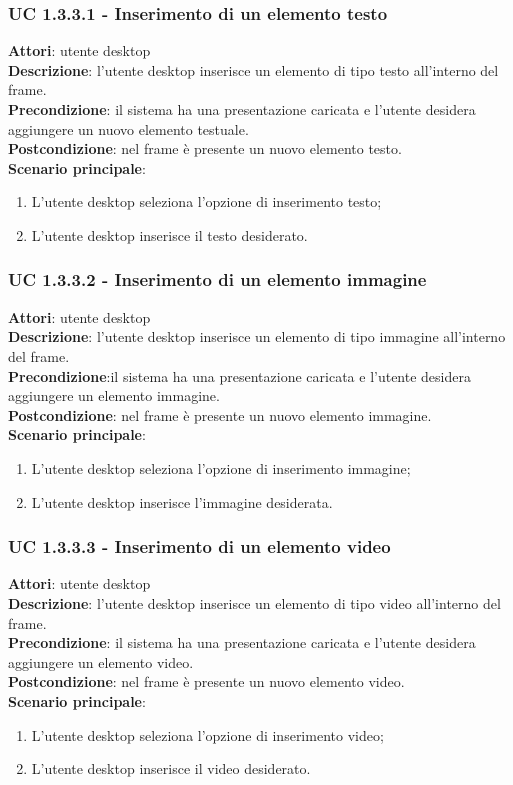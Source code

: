 \subsubsection{UC 1.3.3.1 - Inserimento di un elemento testo}{
	\label{uc1.3.3.1}
	\textbf{Attori}: utente desktop \\
	\textbf{Descrizione}: l'utente desktop inserisce un elemento di tipo testo all'interno del frame. \\
	\textbf{Precondizione}: il sistema ha una presentazione caricata e l'utente desidera aggiungere un nuovo elemento testuale.	\\
	\textbf{Postcondizione}: nel frame è presente un nuovo elemento testo.	\\
	\textbf{Scenario principale}:
	\begin{enumerate}
		\item L'utente desktop seleziona l'opzione di inserimento testo;
		\item L'utente desktop inserisce il testo desiderato.
	\end{enumerate}
	}
\subsubsection{UC 1.3.3.2 - Inserimento di un elemento immagine}{
	\label{uc1.3.3.2}
	\textbf{Attori}: utente desktop \\
	\textbf{Descrizione}: l'utente desktop inserisce un elemento di tipo immagine all'interno del frame. \\
	\textbf{Precondizione}:il sistema ha una presentazione caricata e l'utente desidera aggiungere un elemento immagine.	\\
	\textbf{Postcondizione}: nel frame è presente un nuovo elemento immagine.	\\
	\textbf{Scenario principale}:
	\begin{enumerate}
		\item L'utente desktop seleziona l'opzione di inserimento immagine;
		\item L'utente desktop inserisce l'immagine desiderata.
	\end{enumerate}
	}
\subsubsection{UC 1.3.3.3 - Inserimento di un elemento video}{
	\label{uc1.3.3.3}
	\textbf{Attori}: utente desktop \\
	\textbf{Descrizione}: l'utente desktop inserisce un elemento di tipo video all'interno del frame. \\
	\textbf{Precondizione}: il sistema ha una presentazione caricata e l'utente desidera aggiungere un elemento video.	\\
	\textbf{Postcondizione}: nel frame è presente un nuovo elemento video.	\\
	\textbf{Scenario principale}:
	\begin{enumerate}
		\item L'utente desktop seleziona l'opzione di inserimento video;
		\item L'utente desktop inserisce il video desiderato.
	\end{enumerate}
	}
